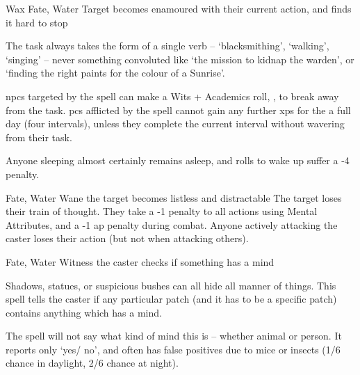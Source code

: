   {}%
  {Wax}%
  {Fate, Water}%
  {}%
  {Target becomes enamoured with their current action, and finds it hard to stop}%
  {
    The task always takes the form of a single verb -- `blacksmithing', `walking', `singing' -- never something convoluted like `the mission to kidnap the warden', or `finding the right paints for the colour of a Sunrise'.

    \Glspl{npc} targeted by the spell can make a Wits + Academics roll, \tn[8], to break away from the task.
    \Glspl{pc} afflicted by the spell cannot gain any further \glspl{xp} for the a full day (four \glspl{interval}), unless they complete the current \gls{interval} without wavering from their task.

  Anyone sleeping almost certainly remains asleep, and rolls to wake up suffer a -4 penalty.
  }

  {Fate, Water}%
  {Wane}%
  {}%
  {}%
  {the target becomes listless and distractable}%
  {
    The target loses their train of thought.
    They take a -1 penalty to all actions using Mental Attributes, and a -1 \gls{ap} penalty during combat.
    Anyone actively attacking the caster loses their action (but not when attacking others).
  }

  {Fate, Water}%
  {Witness}%
  {}%
  {}%
  {the caster checks if something has a mind}%
  {
    Shadows, statues, or suspicious bushes can all hide all manner of things.
    This spell tells the caster if any particular patch (and it has to be a specific patch) contains anything which has a mind.

    The spell will not say what kind of mind this is -- whether animal or person.
    It reports only `yes/ no', and often has false positives due to mice or insects (1/6 chance in daylight, 2/6 chance at night).
  }

